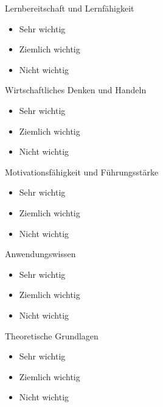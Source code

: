 \documentclass{article}
\begin{document}
Lernbereitschaft und Lernfähigkeit

\begin{itemize}[label={\Square}] 
\item Sehr wichtig
\item Ziemlich wichtig
\item Nicht wichtig
\end{itemize} 
\bigskip 

Wirtschaftliches Denken und Handeln

\begin{itemize}[label={\Square}] 
\item Sehr wichtig
\item Ziemlich wichtig
\item Nicht wichtig
\end{itemize} 
\bigskip 

Motivationsfähigkeit und Führungsstärke

\begin{itemize}[label={\Square}] 
\item Sehr wichtig
\item Ziemlich wichtig
\item Nicht wichtig
\end{itemize} 
\bigskip 

Anwendungswissen

\begin{itemize}[label={\Square}] 
\item Sehr wichtig
\item Ziemlich wichtig
\item Nicht wichtig
\end{itemize} 
\bigskip 

Theoretische Grundlagen

\begin{itemize}[label={\Square}] 
\item Sehr wichtig
\item Ziemlich wichtig
\item Nicht wichtig
\end{itemize} 
\bigskip 
\end{document}
